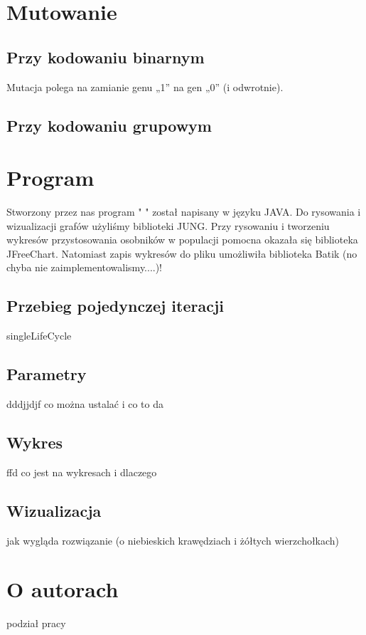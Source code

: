 \documentclass[11pt]{aghdpl}
\begin{document}
\chapter{Mutowanie}
\label{cha:mutation}

\section{Przy kodowaniu binarnym}
\label{sec:kodBin}
Mutacja polega na zamianie genu „1” na gen „0” (i odwrotnie).
\section{Przy kodowaniu grupowym}
\label{sec:kodGru}

\chapter{Program}
\label{cha:program}
Stworzony przez nas program " " został napisany w języku JAVA. Do rysowania i wizualizacji grafów użyliśmy biblioteki JUNG. Przy rysowaniu i tworzeniu wykresów przystosowania osobników w populacji pomocna okazała się biblioteka JFreeChart. Natomiast zapis wykresów do pliku umożliwiła biblioteka Batik (no chyba nie zaimplementowalismy....)!
\section{Przebieg pojedynczej iteracji}
\label{sec:singleLifeCycle}
singleLifeCycle
\section{Parametry}
\label{sec:params}
dddjjdjf
co można ustalać i co to da
\section{Wykres}
\label{sec:chart}
ffd
co jest na wykresach i dlaczego
\section{Wizualizacja}
\label{sec:visualization}
jak wygląda rozwiązanie (o niebieskich krawędziach i żółtych wierzchołkach)

\chapter{O autorach} 
\label{cha:aboutAut}
podział pracy
\end{document}
